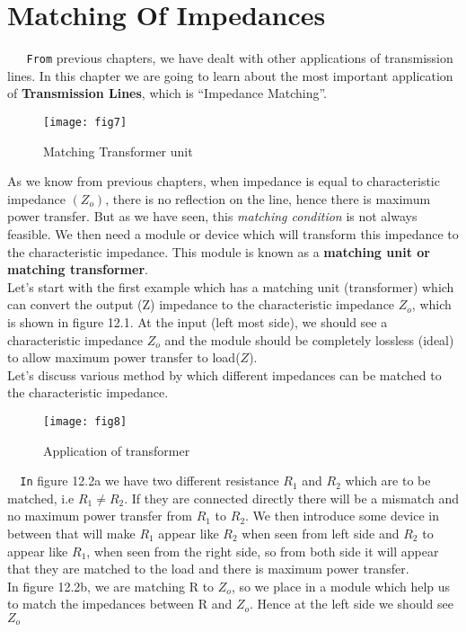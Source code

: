 \chapter{Matching Of Impedances}
\verb|	 From| previous chapters, we have dealt with other applications of transmission lines. In this chapter we are going to learn about the  most important application of \textbf{Transmission Lines}, which is \textquotedblleft Impedance Matching\textquotedblright.
\begin{figure}[h]
	\centering
	\texttt{[image: fig7]}
	\caption{Matching Transformer unit}
\end{figure} As we know from previous chapters, when impedance is equal to characteristic impedance $(Z_o)$, there is no reflection on the line, hence there is maximum power transfer. But as we have seen, this \textit{matching condition} is not always feasible. We then need a module or device which will transform this impedance to the characteristic impedance. This module  is known as a\textbf{ matching unit or matching transformer}. \\ 


Let's start with the first example which has a matching unit (transformer)  which can convert the output (Z) impedance to the characteristic impedance $Z_o$, which is shown in figure 12.1. At the input (left most side), we should see a characteristic impedance $ Z_o$ and the module should be completely lossless (ideal) to allow maximum power transfer to load($Z$).\\

 Let's discuss various method by which different impedances can be matched to the characteristic impedance.\\ 
 \begin{figure}[h]
\centering
\texttt{[image: fig8]}
\caption{Application of transformer}
\end{figure}
\verb| 	In| figure 12.2a we have two different resistance $R_1$ and $R_2$ which are to be matched, i.e $R_1\neq R_2$. If they are connected directly there will be a mismatch and no maximum power transfer from $R_1$ to $R_2$. We then introduce some  device in between that will make $R_1$ appear like $R_2$ when seen  from left side and $R_2$ to appear like  $R_1$, when seen from the right side, so from both side it will appear that they are matched to the load and there is maximum power transfer.\\

 In figure 12.2b, we are matching R to $Z_o$, so we place in a module which help us to match the impedances between R and $Z_o$. Hence at the left side we should see $ Z_o$\\

